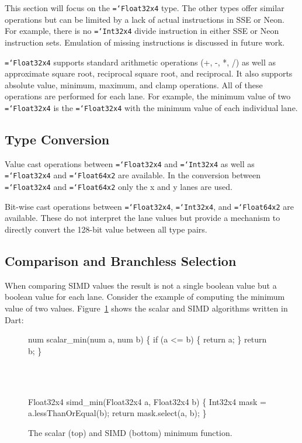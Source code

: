 \documentclass[preprint]{sigplanconf}
\newcommand{\ttt}[1]{{\texttt{\hyphenchar\font=`\-\relax #1}}}%
\begin{document}
This section will focus on the \ttt{Float32x4} type. The other types offer similar
operations but can be limited by a lack of actual instructions in SSE or Neon.
For example, there is no \ttt{Int32x4} divide instruction in either SSE or Neon
instruction sets. Emulation of missing instructions is discussed in future work.

\ttt{Float32x4} supports standard arithmetic operations (+, -, *, /) as well as
approximate square root, reciprocal square root, and reciprocal. It also
supports absolute value, minimum, maximum, and clamp operations. All of these
operations are performed for each lane. For example, the minimum value of two
\ttt{Float32x4} is the \ttt{Float32x4} with the minimum value of each individual
lane.

\subsection{Type Conversion}

Value cast operations between \ttt{Float32x4} and \ttt{Int32x4} as well as
\ttt{Float32x4} and \ttt{Float64x2} are available. In the conversion between
\ttt{Float32x4} and \ttt{Float64x2} only the x and y lanes are used.

Bit-wise cast operations between \ttt{Float32x4}, \ttt{Int32x4}, and
\ttt{Float64x2} are available. These do not interpret the lane values but
provide a mechanism to directly convert the 128-bit value between all type
pairs.

\subsection{Comparison and Branchless Selection}

When comparing SIMD values the result is not a single boolean value but a
boolean value for each lane. Consider the example of computing the minimum value
of two values. Figure~\ref{fig:min} shows the scalar and SIMD algorithms written
in Dart:

\begin{figure}
\begin{small}
\begin{program}[style=tt, number=true]
nu\tab{}m scalar\_min(num a, num b) \{
  if\tab{} (a <= b) \{
    return a;\untab{}
  \}
  return b;\untab{}
\}
\end{program}
\end{small}
\ \ \\ \ \ \\
\begin{small}
\begin{program}[style=tt, number=true]
Fl\tab{}oat32x4 simd\_min(Float32x4 a, Float32x4 b) \{
  Int32x4 mask = a.lessThanOrEqual(b);
  return mask.select(a, b);\untab{}
\}
\end{program}
\end{small}
\caption{The scalar (top) and SIMD (bottom) minimum function.}
\label{fig:min}
\end{figure}
\end{document}
